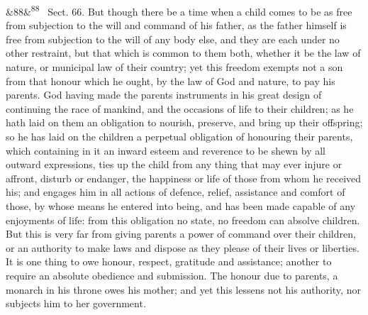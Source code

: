 \documentclass[12pt]{article}
\newcommand{\para}[1][]{\par\noindent\ifx&#1&\else\textsuperscript{\footnotesize #1}~\fi}
\begin{document}
\para[88] Sect. 66. But though there be a time when a child comes to be as free from subjection to the will and command of his father, as the father himself is free from subjection to the will of any body else, and they are each under no other restraint, but that which is common to them both, whether it be the law of nature, or municipal law of their country; yet this freedom exempts not a son from that honour which he ought, by the law of God and nature, to pay his parents. God having made the parents instruments in his great design of continuing the race of mankind, and the occasions of life to their children; as he hath laid on them an obligation to nourish, preserve, and bring up their offspring; so he has laid on the children a perpetual obligation of honouring their parents, which containing in it an inward esteem and reverence to be shewn by all outward expressions, ties up the child from any thing that may ever injure or affront, disturb or endanger, the happiness or life of those from whom he received his; and engages him in all actions of defence, relief, assistance and comfort of those, by whose means he entered into being, and has been made capable of any enjoyments of life: from this obligation no state, no freedom can absolve children. But this is very far from giving parents a power of command over their children, or an authority to make laws and dispose as they please of their lives or liberties. It is one thing to owe honour, respect, gratitude and assistance; another to require an absolute obedience and submission. The honour due to parents, a monarch in his throne owes his mother; and yet this lessens not his authority, nor subjects him to her government.
\end{document}
